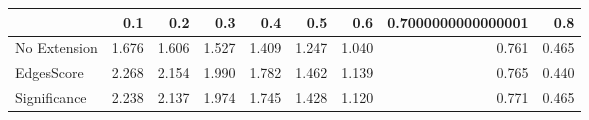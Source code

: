 \begin{tabular}{lrrrrrrrr}
\toprule
{} &   0.1 &   0.2 &   0.3 &   0.4 &   0.5 &   0.6 & 0.7000000000000001 &   0.8 \\
\midrule
No Extension & 1.676 & 1.606 & 1.527 & 1.409 & 1.247 & 1.040 &              0.761 & 0.465 \\
EdgesScore   & 2.268 & 2.154 & 1.990 & 1.782 & 1.462 & 1.139 &              0.765 & 0.440 \\
Significance & 2.238 & 2.137 & 1.974 & 1.745 & 1.428 & 1.120 &              0.771 & 0.465 \\
\bottomrule
\end{tabular}
